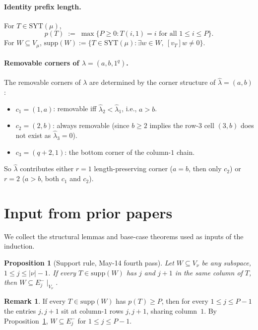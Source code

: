 \documentclass[11pt]{article}
\newtheorem{proposition}[theorem]{Proposition}
\theoremstyle{definition}
\newtheorem{remark}[theorem]{Remark}
\newcommand{\hatl}{\widehat\lambda}
\newcommand{\supp}{\mathrm{supp}}
\newcommand{\SYT}{\mathrm{SYT}}
\begin{document}
\paragraph{Identity prefix length.}
For $T \in \SYT(\mu)$,
\[
   p(T) \;:=\; \max\{P \ge 0 : T(i, 1) = i \text{ for all } 1 \le i \le P\}.
\]
For $W \subseteq V_\mu$,
$\supp(W) := \{T \in \SYT(\mu) : \exists w \in W,\ [v_T] w \ne 0\}$.

\paragraph{Removable corners of $\lambda = (a, b, 1^q)$.}
The removable corners of $\lambda$ are determined by the corner
structure of $\hatl = (a, b)$:
\begin{itemize}[topsep=0.2em,itemsep=0.1em]
\item $c_1 = (1, a)$: removable iff $\hatl_2 < \hatl_1$, i.e., $a > b$.
\item $c_2 = (2, b)$: always removable (since $b \ge 2$ implies the
   row-3 cell $(3, b)$ does not exist as $\hatl_3 = 0$).
\item $c_3 = (q + 2, 1)$: the bottom corner of the column-$1$ chain.
\end{itemize}
So $\hatl$ contributes either $r = 1$ length-preserving corner
($a = b$, then only $c_2$) or $r = 2$ ($a > b$, both $c_1$ and $c_2$).

\section{Input from prior papers}\label{sec:input}

We collect the structural lemmas and base-case theorems used as inputs
of the induction.

\begin{proposition}[Support rule, May-14 fourth pass]\label{prop:support-rule}
Let $W \subseteq V_\nu$ be any subspace, $1 \le j \le |\nu|-1$.
If every $T \in \supp(W)$ has $j$ and $j+1$ in the same column of $T$,
then $W \subseteq E_j^-\!\mid_{V_\nu}$.
\end{proposition}

\begin{remark}\label{rem:prefix-implies-Ej-}
If every $T \in \supp(W)$ has $p(T) \ge P$, then for every
$1 \le j \le P - 1$ the entries $j, j+1$ sit at column-$1$ rows
$j, j+1$, sharing column~$1$.  By Proposition~\ref{prop:support-rule},
$W \subseteq E_j^-$ for $1 \le j \le P - 1$.
\end{remark}
\end{document}

